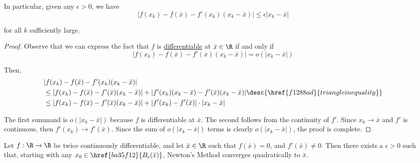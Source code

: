 In particular, given any $\epsilon>0$, we have
$$
  |f(x_k)-f(\bar x)-f'(x_k)(x_k-\bar x)|\leq\epsilon|x_k-\bar x|
$$

for all $k$ sufficiently large.

\begin{proof}
  Observe that we can express the fact that $f$ is
  \href{c62315d}{differentiable} at $\bar x\in\R$ if and only if
  $$
    |f(x_k)-f(\bar x)-f'(\bar x)(x_k-\bar x)|=o(|x_k-\bar x|)
  $$

  Then,
  \begin{align*}
     &|f(x_k)-f(\bar x)-f'(x_k)(x_k-\bar x)|                                                                                               \\
     &\leq|f(x_k)-f(\bar x)-f'(\bar x)(x_k-\bar x)|+|f'(x_k)(x_k-\bar x)-f'(\bar x)(x_k-\bar x)|\desc{\href{f1288ad}{triangle inequality}} \\
     &\leq|f(x_k)-f(\bar x)-f'(\bar x)(x_k-\bar x)|+|f'(x_k)-f'(\bar x)|\cdot|x_k-\bar x|
  \end{align*}

  The first summand is $o(|x_k-\bar x|)$ because $f$ is differentiable at $\bar
  x$. The second follows from the continuity of $f'$. Since $x_k\to\bar x$ and
  $f'$ is continuous, then $f'(x_k)\to f'(\bar x)$. Since the sum of
  $o(|x_k-\bar x|)$ terms is clearly $o(|x_k-\bar x|)$, the proof is complete.
\end{proof}

\label{e0895e9}

Let $f:\R\to\R$ be twice continuously differentiable, and let $\bar x\in\R$
such that $f(\bar x)=0$, and $f'(\bar x)\neq0$. Then there exists a
$\epsilon>0$ such that, starting with any $x_0\in\href{ba35f12}{B_\epsilon(\bar
x)}$, Newton's Method converges quadratically to $\bar x$.

